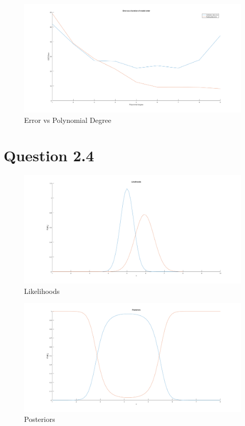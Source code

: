 \begin{figure}[H]
    \includegraphics[width=\linewidth]{../../pracs/week3/images/q1_err_vs_degree}
    \centering
    \caption{Error vs Polynomial Degree}
\end{figure}

\section*{Question 2.4}



\begin{figure}[H]
    \includegraphics[width=\linewidth]{../../pracs/week3/images/q4_likelihoods}
    \centering
    \caption{Likelihoods}
\end{figure}

\begin{figure}[H]
    \includegraphics[width=\linewidth]{../../pracs/week3/images/q4_posteriors}
    \centering
    \caption{Posteriors}
\end{figure}

